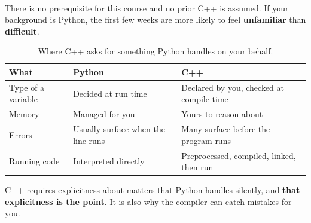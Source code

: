 \documentclass[
    10pt,
    dvipsnames,
    svgnames,
    x11names,
    aspectratio=1610,
    english,
    codeminted]{beamer}
\begin{document}
\begin{frame}[fragile]{\secname}
\framesubtitle{\subsecname}
There is no prerequisite for this course and no prior C++ is assumed. If your background is Python, the first few weeks are more likely to feel \textbf{unfamiliar} than \textbf{difficult}.

\begin{table}[h]
\caption{Where C++ asks for something Python handles on your behalf.}
\footnotesize\centering
\renewcommand{\arraystretch}{1.2}
\begin{tabular}{m{3.6cm}m{4.2cm}m{4.4cm}}
  \toprule
  \textbf{What} & \textbf{Python} & \textbf{C++} \\
  \midrule
  Type of a variable & Decided at run time          & Declared by you, checked at compile time \\
  Memory             & Managed for you              & Yours to reason about \\
  Errors             & Usually surface when the line runs & Many surface before the program runs \\
  Running code       & Interpreted directly         & Preprocessed, compiled, linked, then run \\
  \bottomrule
\end{tabular}
\end{table}

\medskip
\begin{MyBox}
C++ requires explicitness about matters that Python handles silently, and \textbf{that explicitness is the point}. It is also why the compiler can catch mistakes for you.
\end{MyBox}
\end{frame}

\end{document}
